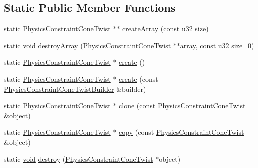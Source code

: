 \subsection*{Static Public Member Functions}
\begin{DoxyCompactItemize}
\item 
static \mbox{\hyperlink{classnjli_1_1_physics_constraint_cone_twist}{Physics\+Constraint\+Cone\+Twist}} $\ast$$\ast$ \mbox{\hyperlink{classnjli_1_1_physics_constraint_cone_twist_a9320581689ebce20210ed1d0239d1257}{create\+Array}} (const \mbox{\hyperlink{_util_8h_a10e94b422ef0c20dcdec20d31a1f5049}{u32}} size)
\item 
static \mbox{\hyperlink{_thread_8h_af1e856da2e658414cb2456cb6f7ebc66}{void}} \mbox{\hyperlink{classnjli_1_1_physics_constraint_cone_twist_aa963148686e225ef41a5f101a4ae51c1}{destroy\+Array}} (\mbox{\hyperlink{classnjli_1_1_physics_constraint_cone_twist}{Physics\+Constraint\+Cone\+Twist}} $\ast$$\ast$array, const \mbox{\hyperlink{_util_8h_a10e94b422ef0c20dcdec20d31a1f5049}{u32}} size=0)
\item 
static \mbox{\hyperlink{classnjli_1_1_physics_constraint_cone_twist}{Physics\+Constraint\+Cone\+Twist}} $\ast$ \mbox{\hyperlink{classnjli_1_1_physics_constraint_cone_twist_a038c356380d19df8c4cf8830298e4092}{create}} ()
\item 
static \mbox{\hyperlink{classnjli_1_1_physics_constraint_cone_twist}{Physics\+Constraint\+Cone\+Twist}} $\ast$ \mbox{\hyperlink{classnjli_1_1_physics_constraint_cone_twist_ad5435f5177a5d4980ba8f1073e91eafa}{create}} (const \mbox{\hyperlink{classnjli_1_1_physics_constraint_cone_twist_builder}{Physics\+Constraint\+Cone\+Twist\+Builder}} \&builder)
\item 
static \mbox{\hyperlink{classnjli_1_1_physics_constraint_cone_twist}{Physics\+Constraint\+Cone\+Twist}} $\ast$ \mbox{\hyperlink{classnjli_1_1_physics_constraint_cone_twist_aae501e94d550f61640012cda44d6d690}{clone}} (const \mbox{\hyperlink{classnjli_1_1_physics_constraint_cone_twist}{Physics\+Constraint\+Cone\+Twist}} \&object)
\item 
static \mbox{\hyperlink{classnjli_1_1_physics_constraint_cone_twist}{Physics\+Constraint\+Cone\+Twist}} $\ast$ \mbox{\hyperlink{classnjli_1_1_physics_constraint_cone_twist_afeb1730a2b010167a283cb04f94a154a}{copy}} (const \mbox{\hyperlink{classnjli_1_1_physics_constraint_cone_twist}{Physics\+Constraint\+Cone\+Twist}} \&object)
\item 
static \mbox{\hyperlink{_thread_8h_af1e856da2e658414cb2456cb6f7ebc66}{void}} \mbox{\hyperlink{classnjli_1_1_physics_constraint_cone_twist_a4744a8d88fc827477a9ca1deb3781f4c}{destroy}} (\mbox{\hyperlink{classnjli_1_1_physics_constraint_cone_twist}{Physics\+Constraint\+Cone\+Twist}} $\ast$object)

\end{DoxyCompactItemize}
